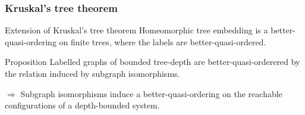 \documentclass{beamer}
\begin{document}
\begin{frame}
  \frametitle{Kruskal's tree theorem}
  \begin{block}{Extension of Kruskal's tree theorem \cite{Laver71OnFraissesOrderTypeConjecture}}
  Homeomorphic tree embedding is a better-quasi-ordering on finite trees, where the labels are better-quasi-ordered.
  \end{block}

  \vspace{10pt}

  \begin{block}{Proposition}
  Labelled graphs of bounded tree-depth are better-quasi-orderered by the relation induced by subgraph isomorphisms.
  \end{block}

  \vspace{10pt}

  $\Rightarrow$ Subgraph isomorphisms induce a better-quasi-ordering on the reachable configurations of a depth-bounded system.
\end{frame}
\end{document}
